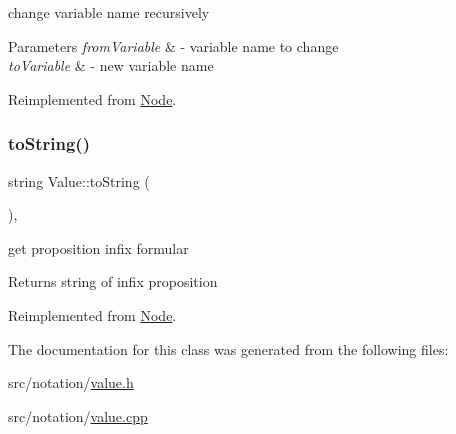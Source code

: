 change variable name recursively 


\begin{DoxyParams}{Parameters}
{\em from\+Variable} & -\/ variable name to change \\
\hline
{\em to\+Variable} & -\/ new variable name \\
\hline
\end{DoxyParams}


Reimplemented from \hyperlink{class_node_ae9bb2ba5b99e08fcd6f9aff0814a740f}{Node}.

\mbox{\label{class_value_aa774521b29b4f0c77eb6d57b5a6fb3a0}} 
\subsubsection{\texorpdfstring{to\+String()}{toString()}}
{\footnotesize\ttfamily string Value\+::to\+String (\begin{DoxyParamCaption}{ }\end{DoxyParamCaption})\hspace{0.3cm}{\ttfamily [override]}, {\ttfamily [virtual]}}



get proposition infix formular 

\begin{DoxyReturn}{Returns}
string of infix proposition 
\end{DoxyReturn}


Reimplemented from \hyperlink{class_node_a0746502074a232243dcac3b96f3ce2d0}{Node}.



The documentation for this class was generated from the following files\+:\begin{DoxyCompactItemize}
\item 
src/notation/\hyperlink{value_8h}{value.\+h}\item 
src/notation/\hyperlink{value_8cpp}{value.\+cpp}\end{DoxyCompactItemize}
